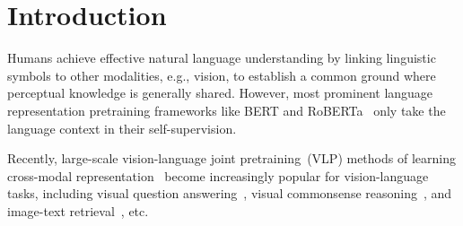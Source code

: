 \section{Introduction}
Humans achieve effective natural language understanding by linking linguistic symbols 
to other modalities, e.g., vision, to establish a common ground where perceptual knowledge 
is generally shared. However, most prominent language representation pretraining frameworks 
like BERT and RoBERTa~\citep{devlin-etal-2019-bert,DBLP:journals/corr/abs-1907-11692} only 
take the language context in their self-supervision.

Recently, large-scale vision-language joint pretraining~(VLP) methods of learning 
cross-modal representation~\citep{lxmert,uniter,oscar} become increasingly popular for 
vision-language tasks, including visual question answering~\citep{vqa}, visual commonsense 
reasoning~\citep{vcr}, and image-text retrieval~\citep{itr}, etc. 

